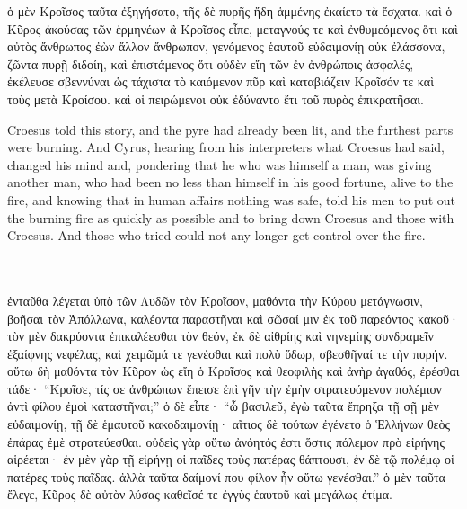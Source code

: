 \documentclass{article}
\begin{document}
\begin{greek}
ὁ μὲν Κροῖσος ταῦτα ἐξηγήσατο, τῆς δὲ πυρῆς ἤδη ἁμμένης ἐκαίετο τὰ ἔσχατα.
καὶ ὁ Κῦρος ἀκούσας τῶν ἑρμηνέων ἃ Κροῖσος εἶπε,
μεταγνούς τε καὶ ἐνθυμεόμενος ὅτι καὶ αὐτὸς ἄνθρωπος ἐὼν ἄλλον ἄνθρωπον,
γενόμενος ἑαυτοῦ εὐδαιμονίῃ οὐκ ἐλάσσονα, ζῶντα πυρῇ διδοίη,
καὶ ἐπιστάμενος ὅτι οὐδὲν εἴη τῶν ἐν ἀνθρώποις ἀσφαλές,
ἐκέλευσε σβεννύναι ὡς τάχιστα τὸ καιόμενον πῦρ
καὶ καταβιάζειν Κροῖσόν τε καὶ τοὺς μετὰ Κροίσου.
καὶ οἱ πειρώμενοι οὐκ ἐδύναντο ἔτι τοῦ πυρὸς ἐπικρατῆσαι. \\
\end{greek}


Croesus told this story, and the pyre had already been lit, and the furthest parts were burning.
And Cyrus, hearing from his interpreters what Croesus had said, changed his mind
and, pondering that he who was himself a man, was giving another man,
who had been no less than himself in his good fortune, alive to the fire,
and knowing that in human affairs nothing was safe, told his men to put out the burning fire as quickly as possible
and to bring down Croesus and those with Croesus.
And those who tried could not any longer get control over the fire. \\ \\ \\

\begin{greek}
ἐνταῦθα λέγεται ὑπὸ τῶν Λυδῶν τὸν Κροῖσον, μαθόντα τὴν Κύρου μετάγνωσιν,
βοῆσαι τὸν Ἀπόλλωνα, καλέοντα παραστῆναι καὶ σῶσαί μιν ἐκ τοῦ παρεόντος κακοῦ·
τὸν μὲν δακρύοντα ἐπικαλέεσθαι τὸν θεόν,
ἐκ δὲ αἰθρίης καὶ νηνεμίης συνδραμεῖν ἐξαίφνης νεφέλας,
καὶ χειμῶμά τε γενέσθαι καὶ πολὺ ὕδωρ, σβεσθῆναί τε τὴν πυρήν.
οὕτω δὴ μαθόντα τὸν Κῦρον ὡς εἴη ὁ Κροῖσος καὶ θεοφιλὴς καὶ ἀνὴρ ἀγαθός, ἐρέσθαι τάδε·
“Κροῖσε, τίς σε ἀνθρώπων ἔπεισε ἐπὶ γῆν τὴν ἐμὴν στρατευόμενον πολέμιον ἀντὶ φίλου ἐμοὶ καταστῆναι;”
ὁ δὲ εἶπε· “ὦ βασιλεῦ, ἐγὼ ταῦτα ἔπρηξα τῇ σῇ μὲν εὐδαιμονίῃ, τῇ δὲ ἑμαυτοῦ κακοδαιμονίῃ·
αἴτιος δὲ τούτων ἐγένετο ὁ Ἑλλήνων θεὸς ἐπάρας ἐμὲ στρατεύεσθαι.
οὐδεὶς γὰρ οὕτω ἀνόητός ἐστι ὅστις πόλεμον πρὸ εἰρήνης αἱρέεται·
ἐν μὲν γὰρ τῇ εἰρήνῃ οἱ παῖδες τοὺς πατέρας θάπτουσι,
ἐν δὲ τῷ πολέμῳ οἱ πατέρες τοὺς παῖδας. ἀλλὰ ταῦτα δαίμονί που φίλον ἦν οὕτω γενέσθαι.”
ὁ μὲν ταῦτα ἔλεγε, Κῦρος δὲ αὐτὸν λύσας καθεῖσέ τε ἐγγὺς ἑαυτοῦ καὶ μεγάλως ἐτίμα. \\
\end{greek}
\end{document}
